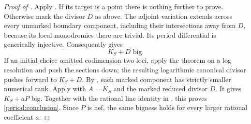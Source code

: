 \begin{proof}[Proof of ]
Apply .  If its target is a point there
is nothing further to prove.  Otherwise mark the divisor $D$
as above.  The adjoint variation extends across every unmarked
boundary component, including their intersections away from
$D$, because its local monodromies there are trivial.  Its
period differential is generically injective.  Consequently
\cite[Theorem~1.1]{BrunebarbeCadorel} gives
\[
                              K_S+D\text{ big}.
\]
If an initial choice omitted codimension-two loci, apply the
theorem on a log resolution and push the sections down; the
resulting logarithmic canonical divisor pushes forward to
$K_S+D$.  By , each marked component
has strictly smaller numerical rank.  Apply  with $A=K_S$ and the marked reduced
divisor $D$. It gives $K_S+aP$ big.  Together with the
rational line identity in , this proves
\eqref{period:conclusion}.  Since $P$ is nef, the same bigness
holds for every larger rational coefficient $a$.
\end{proof}
